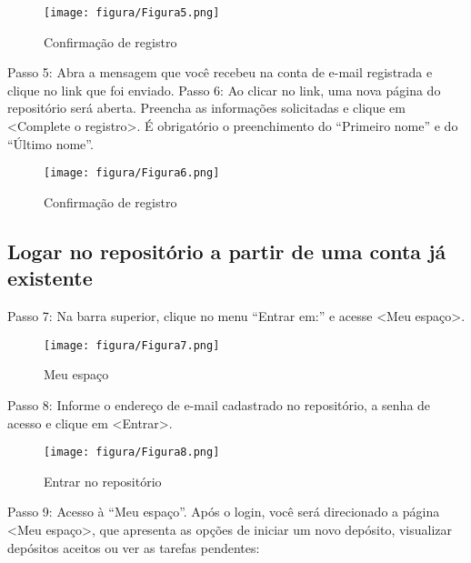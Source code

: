 \documentclass[12pt,hidelinks]{article}
\begin{document}
        \begin{figure}[!htp]
                \centering
                \texttt{[image: figura/Figura5.png]}
                \caption{Confirmação de registro}
            \label{Rotulo}
        \end{figure}
        
        Passo 5: Abra a mensagem que você recebeu na conta de e-mail registrada e clique no link que foi enviado.
        \singlespacing
        Passo 6: Ao clicar no link, uma nova página do repositório será aberta. Preencha as informações solicitadas e clique em <Complete o registro>. É obrigatório o preenchimento do “Primeiro nome” e do “Último nome”. 
        
        \begin{figure}[!htp]
                \centering
                \texttt{[image: figura/Figura6.png]}
                \caption{Confirmação de registro}
            \label{Rotulo}
        \end{figure}
        
\newpage
        \subsection{Logar no repositório a partir de uma conta já existente}
        
        Passo 7: Na barra superior, clique no menu “Entrar em:” e acesse <Meu espaço>.
        
        \begin{figure}[!htp]
                \centering
                \texttt{[image: figura/Figura7.png]}
                \caption{Meu espaço}
            \label{Rotulo}
        \end{figure}
        
        Passo 8: Informe o endereço de e-mail cadastrado no repositório, a senha de acesso e clique em <Entrar>.
        
        \begin{figure}[!htp]
                \centering
                \texttt{[image: figura/Figura8.png]}
                \caption{Entrar no repositório}
            \label{Rotulo}
        \end{figure}
        
\newpage
        Passo 9: Acesso à “Meu espaço”. Após o login, você será direcionado a página <Meu espaço>, que apresenta as opções de iniciar um novo depósito, visualizar depósitos aceitos ou ver as tarefas pendentes:
        
\end{document}
